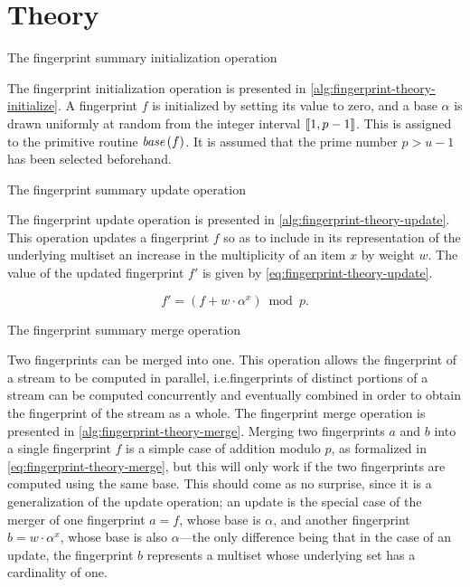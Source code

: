 \section{Theory}
\label{sec:fingerprint-theory}

\begin{algorithm}
  \caption{The fingerprint summary initialization operation}
  \label{alg:fingerprint-theory-initialize}
  
\end{algorithm}

The fingerprint initialization operation is presented in \cref{alg:fingerprint-theory-initialize}.
A fingerprint \( f \) is initialized by setting its value to zero, and a base \( \alpha \) is drawn uniformly at random from the integer interval \( \llbracket1, p - 1\rrbracket \).
This is assigned to the primitive routine \( \base (f) \).
It is assumed that the prime number \( p > u - 1 \) has been selected beforehand.

\begin{algorithm}
  \caption{The fingerprint summary update operation}
  \label{alg:fingerprint-theory-update}
  
\end{algorithm}

The fingerprint update operation is presented in \cref{alg:fingerprint-theory-update}.
This operation updates a fingerprint \( f \) so as to include in its representation of the underlying multiset an increase in the multiplicity of an item \( x \) by weight \( w \).
The value of the updated fingerprint \( f' \) is given by \cref{eq:fingerprint-theory-update}.

\begin{equation}
  \label{eq:fingerprint-theory-update}
  f' = \left( f + w \cdot \alpha^{x} \right) \bmod p.
\end{equation}

\begin{algorithm}
  \caption{The fingerprint summary merge operation}
  \label{alg:fingerprint-theory-merge}
  
\end{algorithm}

Two fingerprints can be merged into one.
This operation allows the fingerprint of a stream to be computed in parallel, i.e.\@ fingerprints of distinct portions of a stream can be computed concurrently and eventually combined in order to obtain the fingerprint of the stream as a whole.
The fingerprint merge operation is presented in \cref{alg:fingerprint-theory-merge}.
Merging two fingerprints \( a \) and \( b \) into a single fingerprint \( f \) is a simple case of addition modulo \( p \), as formalized in \cref{eq:fingerprint-theory-merge}, but this will only work if the two fingerprints are computed using the same base.
This should come as no surprise, since it is a generalization of the update operation; an update is the special case of the merger of one fingerprint \( a = f \), whose base is \( \alpha \), and another fingerprint \( b = w \cdot \alpha^{x} \), whose base is also \( \alpha \)---the only difference being that in the case of an update, the fingerprint \( b \) represents a multiset whose underlying set has a cardinality of one.

